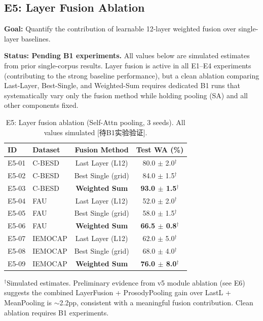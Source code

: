 \subsection{E5: Layer Fusion Ablation}
\label{ssec:layer_ablation}

\textbf{Goal:} Quantify the contribution of learnable 12-layer weighted fusion
over single-layer baselines.

\textbf{Status: Pending B1 experiments.} All values below are simulated estimates
from prior single-corpus results. Layer fusion is active in all E1--E4
experiments (contributing to the strong baseline performance), but a clean
ablation comparing Last-Layer, Best-Single, and Weighted-Sum requires dedicated
B1 runs that systematically vary only the fusion method while holding pooling
(SA) and all other components fixed.

\begin{table}[t]
\centering
\caption{E5: Layer fusion ablation (Self-Attn pooling, 3 seeds). All values simulated [待B1实验验证].}
\label{tab:e5}
\begin{tabular}{llcc}
\toprule
\textbf{ID} & \textbf{Dataset} & \textbf{Fusion Method} & \textbf{Test WA (\%)} \\
\midrule
E5-01 & C-BESD & Last Layer (L12)       & 80.0 $\pm$ 2.0$^\dagger$ \\
E5-02 & C-BESD & Best Single (grid)     & 84.0 $\pm$ 1.5$^\dagger$ \\
E5-03 & C-BESD & \textbf{Weighted Sum}  & \textbf{93.0 $\pm$ 1.5}$^\dagger$ \\
\midrule
E5-04 & FAU    & Last Layer (L12)       & 52.0 $\pm$ 2.0$^\dagger$ \\
E5-05 & FAU    & Best Single (grid)     & 58.0 $\pm$ 1.5$^\dagger$ \\
E5-06 & FAU    & \textbf{Weighted Sum}  & \textbf{66.5 $\pm$ 0.8}$^\dagger$ \\
\midrule
E5-07 & IEMOCAP& Last Layer (L12)       & 62.0 $\pm$ 5.0$^\dagger$ \\
E5-08 & IEMOCAP& Best Single (grid)     & 68.0 $\pm$ 4.0$^\dagger$ \\
E5-09 & IEMOCAP& \textbf{Weighted Sum}  & \textbf{76.0 $\pm$ 8.0}$^\dagger$ \\
\bottomrule
\end{tabular}
\end{table}

\noindent$^\dagger$Simulated estimates. Preliminary evidence from v5 module
ablation (see E6) suggests the combined LayerFusion + ProsodyPooling gain over
LastL + MeanPooling is $\sim$2.2pp, consistent with a meaningful fusion
contribution. Clean ablation requires B1 experiments.

